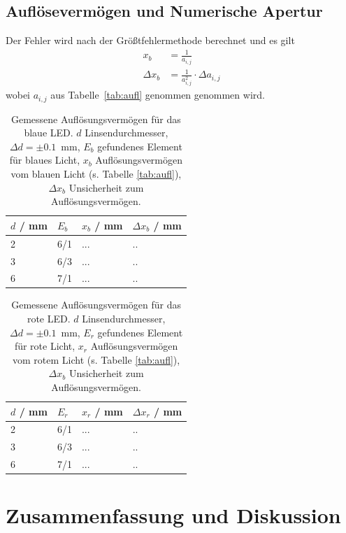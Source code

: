 \documentclass{article}
\begin{document}
\subsection{Auflösevermögen und Numerische Apertur}


Der Fehler wird nach der Größtfehlermethode berechnet und es gilt
\begin{align*}
x_b &= \frac{1}{a_{i,j}} \\
\Delta x_b &= \frac{1}{a_{i,j}^2}\cdot \Delta a_{i,j}
\end{align*}
wobei $a_{i,j}$ aus Tabelle~\ref{tab:aufl} genommen genommen wird. 


\begin{table}[H]
\caption{Gemessene Auflösungsvermögen für das blaue LED. $d$ Linsendurchmesser, $\Delta d = \pm 0.1$~mm, $E_b$ gefundenes Element für blaues Licht, $x_b$ Auflösungsvermögen vom blauen Licht (s. Tabelle \ref{tab:aufl}), $\Delta x_b$ Unsicherheit zum Auflösungsvermögen.}

\begin{tabular}{llll}
$d$ / mm & $E_b$ & $x_b$ / mm & $\Delta x_b$ / mm \\
\hline
2 & 6/1 & ... & .. \\
3 & 6/3 & ... & .. \\
6 & 7/1 & ... & .. 
\end{tabular}
\end{table}


\begin{table}[H]
\caption{Gemessene Auflösungsvermögen für das rote LED. $d$ Linsendurchmesser, $\Delta d = \pm 0.1$~mm, $E_r$ gefundenes Element für rote Licht, $x_r$ Auflösungsvermögen vom rotem Licht (s. Tabelle \ref{tab:aufl}), $\Delta x_b$ Unsicherheit zum Auflösungsvermögen.}

\begin{tabular}{llll}
$d$ / mm & $E_r$ & $x_r$ / mm & $\Delta x_r$ / mm \\
\hline
2 & 6/1 & ... & .. \\
3 & 6/3 & ... & .. \\
6 & 7/1 & ... & .. 
\end{tabular}
\end{table}






\section{Zusammenfassung und Diskussion}
\end{document}
